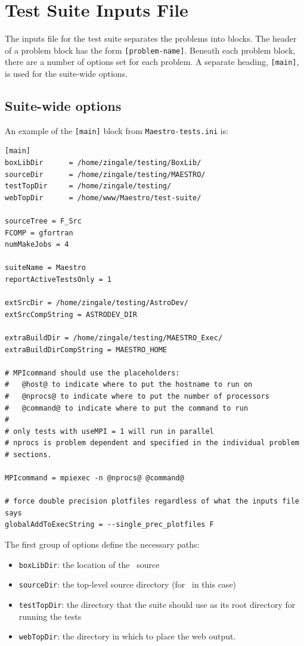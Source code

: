 \section{Test Suite Inputs File}

The inputs file for the test suite separates the problems into blocks.
The header of a problem block has the form {\tt [problem-name]}.
Beneath each problem block, there are a number of options set for each
problem.  A separate heading, {\tt [main]}, is used for the suite-wide
options.

\subsection{Suite-wide options}

An example of the {\tt [main]} block from {\tt Maestro-tests.ini} is:
\begin{lstlisting}
[main]
boxLibDir      = /home/zingale/testing/BoxLib/
sourceDir      = /home/zingale/testing/MAESTRO/
testTopDir     = /home/zingale/testing/
webTopDir      = /home/www/Maestro/test-suite/

sourceTree = F_Src
FCOMP = gfortran
numMakeJobs = 4

suiteName = Maestro
reportActiveTestsOnly = 1

extSrcDir = /home/zingale/testing/AstroDev/
extSrcCompString = ASTRODEV_DIR

extraBuildDir = /home/zingale/testing/MAESTRO_Exec/
extraBuildDirCompString = MAESTRO_HOME

# MPIcommand should use the placeholders:
#   @host@ to indicate where to put the hostname to run on
#   @nprocs@ to indicate where to put the number of processors
#   @command@ to indicate where to put the command to run
#
# only tests with useMPI = 1 will run in parallel
# nprocs is problem dependent and specified in the individual problem
# sections.

MPIcommand = mpiexec -n @nprocs@ @command@

# force double precision plotfiles regardless of what the inputs file says
globalAddToExecString = --single_prec_plotfiles F
\end{lstlisting}

The first group of options define the necessary paths:
\begin{itemize}
\item {\tt boxLibDir}: the location of the \boxlib\ source
\item {\tt sourceDir}: the top-level source directory (for \maestro\ in this case)
\item {\tt testTopDir}: the directory that the suite should use as its
  root directory for running the tests
\item {\tt webTopDir}: the directory in which to place the web output.
\end{itemize}

